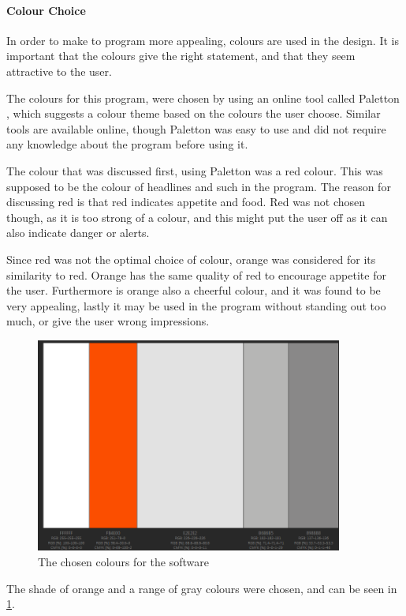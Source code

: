 \paragraph{Colour Choice}

In order to make to program more appealing, colours are used in the design. It is important that the colours give the right statement, and that they seem attractive to the user.

The colours for this program, were chosen by using an online tool called Paletton \cite{paletton}, which suggests a colour theme based on the colours the user choose. Similar tools are available online, though Paletton was easy to use and did not require any knowledge about the program before using it.

The colour that was discussed first, using Paletton was a red colour. This was supposed to be the colour of headlines and such in the program. The reason for discussing red is that red indicates appetite and food\cite{color_psychology}. Red was not chosen though, as it is too strong of a colour, and this might put the user off as it can also indicate danger or alerts.

Since red was not the optimal choice of colour, orange was considered for its similarity to red. Orange has the same quality of red to encourage appetite for the user. Furthermore is orange also a cheerful colour, and it was found to be very appealing, lastly it may be used in the program without standing out too much, or give the user wrong impressions.

\begin{figure}[H]
	\centering
    \includegraphics[width=0.9\textwidth]{Grafik/FoodPlanner/ChosenColours}
	\caption{The chosen colours for the software}
	\label{ChosenColours}
\end{figure}
The shade of orange and a range of gray colours were chosen, and can be seen in \cref{ChosenColours}.

